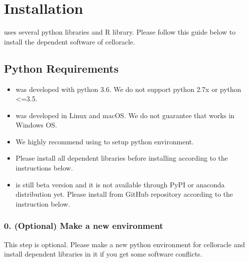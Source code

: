 \documentclass[letterpaper,10pt,english]{sphinxmanual}
\begin{document}
\section{Installation}
\label{\detokenize{installation/index:installation}}\label{\detokenize{installation/index:install}}\label{\detokenize{installation/index::doc}}
 uses several python libraries and R library. Please follow this guide below to install the dependent software of celloracle.


\subsection{Python Requirements}
\label{\detokenize{installation/index:python-requirements}}\label{\detokenize{installation/index:require}}\begin{itemize}
\item {} 
 was developed with python 3.6. We do not support python 2.7x or python \textless{}=3.5.

\item {} 
 was developed in Linux and macOS. We do not guarantee that  works in Windows OS.

\item {} 
We highly recommend using  to setup python environment.

\item {} 
Please install all dependent libraries before installing  according to the instructions below.

\item {} 
  is still beta version and it is not available through PyPI or anaconda distribution yet. Please install  from GitHub repository according to the instruction below.

\end{itemize}


\subsubsection{0. (Optional) Make a new environment}
\label{\detokenize{installation/index:optional-make-a-new-environment}}
This step is optional. Please make a new python environment for celloracle and install dependent libraries in it if you get some software conflicts.
\end{document}

